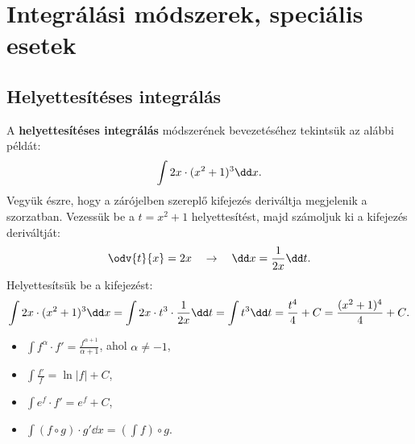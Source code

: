 \section{Integrálási módszerek, speciális esetek}\label{section.7.3}

\subsection{Helyettesítéses integrálás}

\vfill

\begin{blueBox}
  A \textbf{helyettesítéses integrálás} módszerének bevezetéséhez tekintsük az
  alábbi példát:
  \[
    \int 2x \cdot (x^2 + 1)^3 \dd x
    \text.
  \]
  Vegyük észre, hogy a zárójelben szereplő kifejezés deriváltja megjelenik a
  szorzatban. Vezessük be a $t = x^2 + 1$ helyettesítést, majd számoljuk ki a
  kifejezés deriváltját:
  \[
    \odv{t}{x} = 2x
    \quad \rightarrow \quad
    \dd x = \frac{1}{2x} \dd t
    \text.
  \]
  Helyettesítsük be a kifejezést:
  \[
    \int 2x \cdot (x^2 + 1)^3 \dd x
    = \int 2x \cdot t^3 \cdot \frac{1}{2x} \dd t
    = \int t^3 \dd t
    = \frac{t^4}{4} + C
    = \frac{(x^2 + 1)^4}{4} + C
    \text.
  \]
\end{blueBox}

\vfill

\begin{note}
  \begin{itemize}
    \item $\displaystyle \int f^\alpha \cdot f' = \frac{f^{\alpha + 1}}
            {\alpha + 1}$, ahol $\alpha \neq -1$,
    \item $\displaystyle \int \frac{f'}{f} = \ln |f| + C$,
    \item $\displaystyle \int e^f \cdot f' = e^f + C$,
    \item $\displaystyle \int (f \circ g) \cdot g' \dd x = \left( \int f \right)
            \circ g$.
  \end{itemize}
\end{note}

